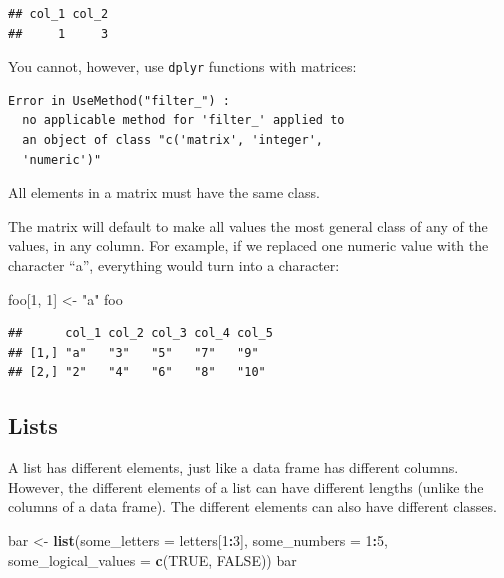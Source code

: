 \documentclass[]{book}
\makeatletter
\newenvironment{Shaded}{\begin{snugshade}}{\end{snugshade}}
\newcommand{\KeywordTok}[1]{\textcolor[rgb]{0.13,0.29,0.53}{\textbf{#1}}}
\newcommand{\DataTypeTok}[1]{\textcolor[rgb]{0.13,0.29,0.53}{#1}}
\newcommand{\DecValTok}[1]{\textcolor[rgb]{0.00,0.00,0.81}{#1}}
\newcommand{\StringTok}[1]{\textcolor[rgb]{0.31,0.60,0.02}{#1}}
\newcommand{\OtherTok}[1]{\textcolor[rgb]{0.56,0.35,0.01}{#1}}
\newcommand{\OperatorTok}[1]{\textcolor[rgb]{0.81,0.36,0.00}{\textbf{#1}}}
\newcommand{\NormalTok}[1]{#1}
\newenvironment{kframe}{%
\medskip{}
\setlength{\fboxsep}{.8em}
 \def\at@end@of@kframe{}%
 \ifinner\ifhmode%
  \def\at@end@of@kframe{\end{minipage}}%
  \begin{minipage}{\columnwidth}%
 \fi\fi%
 \def\FrameCommand##1{\hskip\@totalleftmargin \hskip-\fboxsep
 \colorbox{shadecolor}{##1}\hskip-\fboxsep
     \hskip-\linewidth \hskip-\@totalleftmargin \hskip\columnwidth}%
 \MakeFramed {\advance\hsize-\width
   \@totalleftmargin\z@ \linewidth\hsize
   \@setminipage}}%
 {\par\unskip\endMakeFramed%
 \at@end@of@kframe}
\renewenvironment{Shaded}{\begin{kframe}}{\end{kframe}}
\theoremstyle{definition}
\theoremstyle{definition}
\theoremstyle{definition}
\theoremstyle{remark}
\makeatother
\begin{document}
\begin{verbatim}
## col_1 col_2 
##     1     3
\end{verbatim}

You cannot, however, use \texttt{dplyr} functions with matrices:

\begin{Shaded}
\end{Shaded}

\begin{verbatim}
Error in UseMethod("filter_") : 
  no applicable method for 'filter_' applied to
  an object of class "c('matrix', 'integer',
  'numeric')"
\end{verbatim}

All elements in a matrix must have the same class. \bigskip

The matrix will default to make all values the most general class of any
of the values, in any column. For example, if we replaced one numeric
value with the character ``a'', everything would turn into a character:

\begin{Shaded}
\begin{Highlighting}[]
\NormalTok{foo[}\DecValTok{1}\NormalTok{, }\DecValTok{1}\NormalTok{] <-}\StringTok{ "a"}
\NormalTok{foo}
\end{Highlighting}
\end{Shaded}

\begin{verbatim}
##      col_1 col_2 col_3 col_4 col_5
## [1,] "a"   "3"   "5"   "7"   "9"  
## [2,] "2"   "4"   "6"   "8"   "10"
\end{verbatim}

\subsection{Lists}\label{lists}

A list has different elements, just like a data frame has different
columns. However, the different elements of a list can have different
lengths (unlike the columns of a data frame). The different elements can
also have different classes.

\begin{Shaded}
\begin{Highlighting}[]
\NormalTok{bar <-}\StringTok{ }\KeywordTok{list}\NormalTok{(}\DataTypeTok{some_letters =}\NormalTok{ letters[}\DecValTok{1}\OperatorTok{:}\DecValTok{3}\NormalTok{],}
            \DataTypeTok{some_numbers =} \DecValTok{1}\OperatorTok{:}\DecValTok{5}\NormalTok{, }
            \DataTypeTok{some_logical_values =} \KeywordTok{c}\NormalTok{(}\OtherTok{TRUE}\NormalTok{, }\OtherTok{FALSE}\NormalTok{))}
\NormalTok{bar}
\end{Highlighting}
\end{Shaded}
\end{document}

